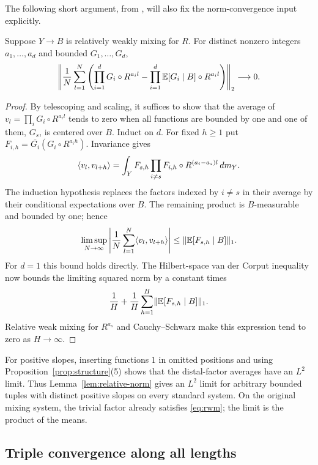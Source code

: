The following short argument, from
\cite[Lemma~2.3]{FourfoldCompanion}, will also fix the norm-convergence
input explicitly.
\begin{lemma}\label{lem:relative-norm}
Suppose $Y\to B$ is relatively weakly mixing for $R$. For distinct
nonzero integers $a_1,\ldots,a_d$ and bounded $G_1,\ldots,G_d$,
\begin{equation}\label{eq:relative-norm}
 \left\|\frac1N\sum_{l=1}^N
 \left(\prod_{i=1}^dG_i\circ R^{a_il}
       -\prod_{i=1}^d\mathbb E[G_i\mid B]\circ R^{a_il}\right)\right\|_2
 \longrightarrow0.
\end{equation}
\end{lemma}
\begin{proof}
By telescoping and scaling, it suffices to show that the average of
$v_l=\prod_i G_i\circ R^{a_il}$ tends to zero when all functions
are bounded by one and one of them, $G_s$, is centered over $B$.
Induct on $d$. For fixed $h\ge1$ put
$F_{i,h}=\overline{G_i}(G_i\circ R^{a_ih})$. Invariance gives
\[
 \langle v_l,v_{l+h}\rangle
 =\int_Y F_{s,h}\prod_{i\ne s}
                  F_{i,h}\circ R^{(a_i-a_s)l}\,d m_Y.
\]
The induction hypothesis replaces the factors indexed by $i\ne s$
in their average by their conditional expectations over $B$. The
remaining product is $B$-measurable and bounded by one; hence
\[
 \limsup_{N\to\infty}
 \left|\frac1N\sum_{l=1}^N\langle v_l,v_{l+h}\rangle\right|
 \le\lVert\mathbb E[F_{s,h}\mid B]\rVert_1.
\]
For $d=1$ this bound holds directly. The Hilbert-space van der
Corput inequality now bounds the limiting squared norm by a constant
times
\[
 \frac1H+\frac1H\sum_{h=1}^H\lVert\mathbb E[F_{s,h}\mid B]\rVert_1.
\]
Relative weak mixing for $R^{a_s}$ and Cauchy--Schwarz make this
expression tend to zero as $H\to\infty$.
\end{proof}

For positive slopes, inserting functions $1$ in omitted positions
and using Proposition~\ref{prop:structure}(5) shows that the
distal-factor averages have an $L^2$ limit. Thus
Lemma~\ref{lem:relative-norm} gives an $L^2$ limit for arbitrary
bounded tuples with distinct positive slopes on every standard
system. On the original mixing system, the trivial factor already
satisfies \eqref{eq:rwm}; the limit is the product of the means.

\subsection{Triple convergence along all lengths}

